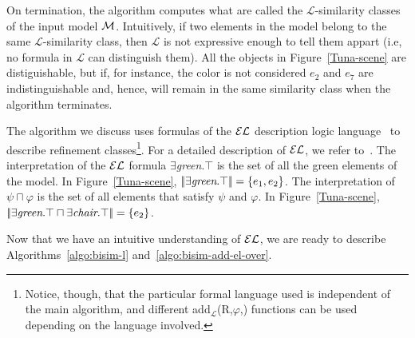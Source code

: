 On termination, the algorithm computes what are called the $\mathcal{L}$-similarity classes of the input model $\mathcal{M}$. Intuitively, if two elements in the model belong to the same $\mathcal{L}$-similarity class, then $\mathcal{L}$ is not expressive enough to tell them appart (i.e, no formula in $\mathcal{L}$ can distinguish them). All the objects in Figure~\ref{Tuna-scene} are distiguishable, but if, for instance, the color is not considered $e_2$ and $e_7$ are indistinguishable and, hence, will remain in the same similarity class when the algorithm terminates. 

The algorithm we discuss uses formulas of the $\mathcal{EL}$ description logic language~\cite{baad:desc03} to describe refinement classes\footnote{Notice, though, that the particular formal language used is independent of the main algorithm, and different add$_{\mathcal{L}}$(R,$\varphi$,\RE) functions can be used depending on the language involved.}. For a detailed description of $\mathcal{EL}$, we refer to~\cite{baad:desc03}.  
The interpretation of the $\mathcal{EL}$ formula $\exists$\emph{green}.$\top$ is the set of all the green elements of the model. In Figure~\ref{Tuna-scene}, $\interp{\exists$\emph{green}.$\top}=\{e_1,e_2\}$. The interpretation of $\psi \sqcap \varphi$ is the set of all elements that satisfy $\psi$ and $\varphi$. In Figure~\ref{Tuna-scene}, $\interp{\exists$\emph{green}.$\top \sqcap \exists$\emph{chair}.$\top}=\{e_2\}$.

Now that we have an intuitive understanding of $\mathcal{EL}$, we are ready to describe Algorithms~\ref{algo:bisim-l} and~\ref{algo:bisim-add-el-over}. 


